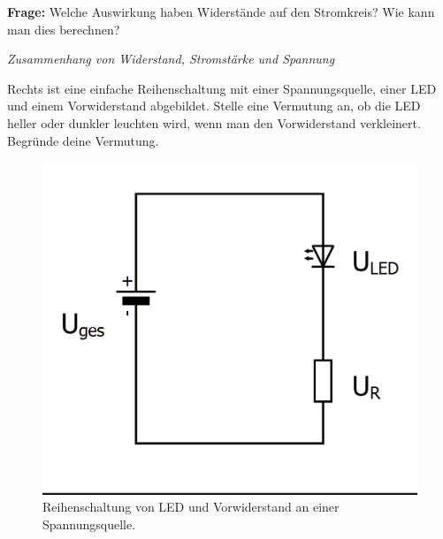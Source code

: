 \begin{ziel}
	\textbf{Frage:} Welche Auswirkung haben Widerstände auf den Stromkreis? Wie kann man dies berechnen?
\end{ziel}

\begin{minipage}{0.58\textwidth}
	\begin{aufgabe} \emph{Zusammenhang von Widerstand, Stromstärke und Spannung}
		
		Rechts ist eine einfache Reihenschaltung mit einer Spannungsquelle, einer LED und einem Vorwiderstand abgebildet. Stelle eine Vermutung an, ob die LED heller oder dunkler leuchten wird, wenn man den Vorwiderstand verkleinert. Begründe deine Vermutung.
	\end{aufgabe}
	\vspace{3\baselineskip}
\end{minipage}
\hfill
\begin{minipage}{0.38\textwidth}
	\begin{figure}[H]
		\centering
		\includegraphics[width=\textwidth]{./Zeichnungen/ReiheLEDWiderstand.png}
		\caption{Reihenschaltung von LED und Vorwiderstand an einer Spannungsquelle.}
		\label{abb:reiheledwiderstand}
	\end{figure}
\end{minipage}


